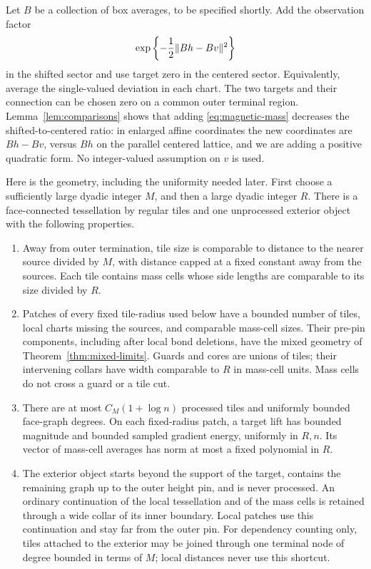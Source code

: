 Let \(B\) be a collection of box averages, to be specified shortly.
Add the observation factor
\begin{equation}\label{eq:magnetic-mass}
 \exp\left\{-\frac12\lVert Bh-Bv\rVert^2\right\}
\end{equation}
in the shifted sector and use target zero in the centered sector.
Equivalently, average the single-valued deviation in each chart.
The two targets and their connection can be chosen zero on a common
outer terminal region. Lemma~\ref{lem:comparisons} shows that adding
\eqref{eq:magnetic-mass} decreases the shifted-to-centered ratio:
in enlarged affine coordinates the new coordinates are \(Bh-Bv\),
versus \(Bh\) on the parallel centered lattice, and we are adding a
positive quadratic form. No integer-valued assumption on \(v\) is used.

Here is the geometry, including the uniformity needed later. First
choose a sufficiently large dyadic integer \(M\), and then a large
dyadic integer \(R\). There is a face-connected tessellation by regular
tiles and one unprocessed exterior object with the following properties.
\begin{enumerate}[label=(\roman*),leftmargin=*]
\item Away from outer termination, tile size is comparable to distance
to the nearer source divided by \(M\), with distance capped at a fixed
constant away from the sources. Each tile contains mass cells whose
side lengths are comparable to its size divided by \(R\).
\item Patches of every fixed tile-radius used below have a bounded
number of tiles, local charts missing the sources, and comparable
mass-cell sizes. Their pre-pin components, including after local bond
deletions, have the mixed geometry of Theorem~\ref{thm:mixed-limits}.
Guards and cores are unions of tiles; their intervening collars have
width comparable to \(R\) in mass-cell units. Mass cells do not cross
a guard or a tile cut.
\item There are at most \(C_M(1+\log n)\) processed tiles and uniformly
bounded face-graph degrees. On each fixed-radius patch, a target lift
has bounded magnitude and bounded sampled gradient energy, uniformly
in \(R,n\). Its vector of mass-cell averages has norm at most a fixed
polynomial in \(R\).
\item The exterior object starts beyond the support of the target,
contains the remaining graph up to the outer height pin, and is never
processed. An ordinary continuation of the local tessellation and
of the mass cells is retained through a wide collar of its inner
boundary. Local patches use this continuation and stay far from the
outer pin. For dependency counting only, tiles attached to the
exterior may be joined through one terminal node of degree bounded
in terms of \(M\); local distances never use this shortcut.
\end{enumerate}

